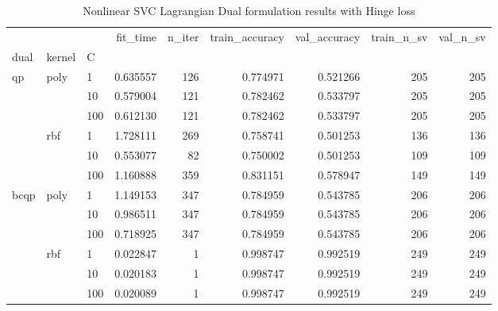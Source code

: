 \begin{table}[H]
\centering
\caption{Nonlinear SVC Lagrangian Dual formulation results with Hinge loss}
\label{nonlinear_lagrangian_dual_svc_cv_results}
\begin{tabular}{lllrrrrrr}
\toprule
     &     &     &  fit\_time &  n\_iter &  train\_accuracy &  val\_accuracy &  train\_n\_sv &  val\_n\_sv \\
dual & kernel & C &           &         &                 &               &             &           \\
\midrule
qp & poly & 1   &  0.635557 &     126 &        0.774971 &      0.521266 &         205 &       205 \\
     &     & 10  &  0.579004 &     121 &        0.782462 &      0.533797 &         205 &       205 \\
     &     & 100 &  0.612130 &     121 &        0.782462 &      0.533797 &         205 &       205 \\
     & rbf & 1   &  1.728111 &     269 &        0.758741 &      0.501253 &         136 &       136 \\
     &     & 10  &  0.553077 &      82 &        0.750002 &      0.501253 &         109 &       109 \\
     &     & 100 &  1.160888 &     359 &        0.831151 &      0.578947 &         149 &       149 \\
bcqp & poly & 1   &  1.149153 &     347 &        0.784959 &      0.543785 &         206 &       206 \\
     &     & 10  &  0.986511 &     347 &        0.784959 &      0.543785 &         206 &       206 \\
     &     & 100 &  0.718925 &     347 &        0.784959 &      0.543785 &         206 &       206 \\
     & rbf & 1   &  0.022847 &       1 &        0.998747 &      0.992519 &         249 &       249 \\
     &     & 10  &  0.020183 &       1 &        0.998747 &      0.992519 &         249 &       249 \\
     &     & 100 &  0.020089 &       1 &        0.998747 &      0.992519 &         249 &       249 \\
\bottomrule
\end{tabular}
\end{table}
